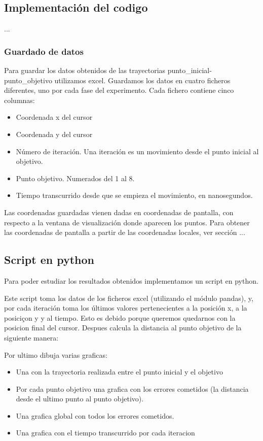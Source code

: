 \documentclass[a4paper,11pt, oneside]{book}
\begin{document}
\subsection{Implementación del codigo}

...

\subsubsection{Guardado de datos}

Para guardar los datos obtenidos de las trayectorias punto\_inicial-punto\_objetivo utilizamos excel. Guardamos los datos en cuatro ficheros diferentes, uno por cada fase del experimento. Cada fichero contiene cinco columnas:
\begin{itemize}
	\item Coordenada x del cursor
	\item Coordenada y del cursor
	\item Número de iteración. Una iteración es un movimiento desde el punto inicial al objetivo.
	\item Punto objetivo. Numerados del 1 al 8.
	\item Tiempo transcurrido desde que se empieza el movimiento, en nanosegundos.
\end{itemize}

Las coordenadas guardadas vienen dadas en coordenadas de pantalla, con respecto a la ventana de visualización donde aparecen los puntos. Para obtener las coordenadas de pantalla a partir de las coordenadas locales, ver sección ...


\subsection{Script en python}

Para poder estudiar los resultados obtenidos implementamos un script en python.

Este script toma los datos de los ficheros excel (utilizando el módulo pandas), y, por cada iteración toma los últimos valores pertenecientes a la posición x, a la posiciçon y y al tiempo. Esto es debido porque queremos quedarnos con la posicion final del cursor. Despues calcula la distancia al punto objetivo de la siguiente manera:

Por ultimo dibuja varias graficas:
\begin{itemize}
	\item Una con la trayectoria realizada entre el punto inicial y el objetivo
	\item Por cada punto objetivo una grafica con los errores cometidos (la distancia desde el ultimo punto al punto objetivo).
	\item Una grafica global con todos los errores cometidos.
	\item Una grafica con el tiempo transcurrido por cada iteracion
\end{itemize}
\end{document}

